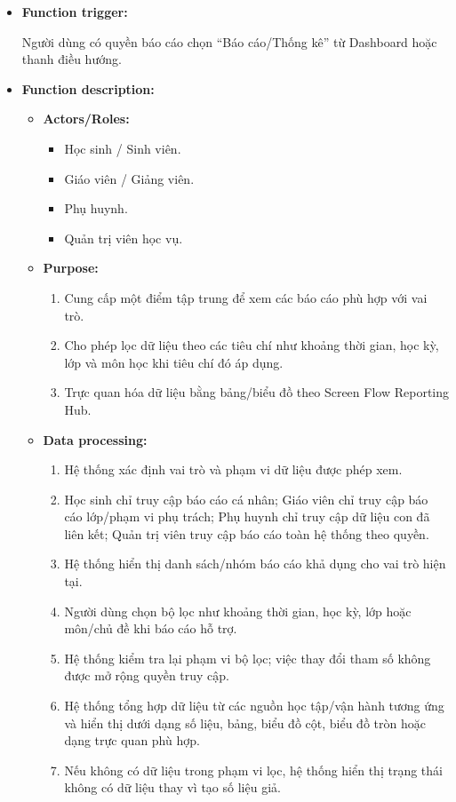 \documentclass[12pt,a4paper,oneside]{report}
\begin{document}
\begin{itemize}

    \item \textbf{Function trigger:}

    Người dùng có quyền báo cáo chọn ``Báo cáo/Thống kê'' từ Dashboard hoặc thanh điều hướng.

    \item \textbf{Function description:}

    \begin{itemize}

        \item \textbf{Actors/Roles:}
        \begin{itemize}
            \item Học sinh / Sinh viên.
            \item Giáo viên / Giảng viên.
            \item Phụ huynh.
            \item Quản trị viên học vụ.
        \end{itemize}

        \item \textbf{Purpose:}
        \begin{enumerate}
            \item Cung cấp một điểm tập trung để xem các báo cáo phù hợp với vai trò.
            \item Cho phép lọc dữ liệu theo các tiêu chí như khoảng thời gian, học kỳ, lớp và môn học khi tiêu chí đó áp dụng.
            \item Trực quan hóa dữ liệu bằng bảng/biểu đồ theo Screen Flow Reporting Hub.
        \end{enumerate}

        \item \textbf{Data processing:}
        \begin{enumerate}
            \item Hệ thống xác định vai trò và phạm vi dữ liệu được phép xem.
            \item Học sinh chỉ truy cập báo cáo cá nhân; Giáo viên chỉ truy cập báo cáo lớp/phạm vi phụ trách; Phụ huynh chỉ truy cập dữ liệu con đã liên kết; Quản trị viên truy cập báo cáo toàn hệ thống theo quyền.
            \item Hệ thống hiển thị danh sách/nhóm báo cáo khả dụng cho vai trò hiện tại.
            \item Người dùng chọn bộ lọc như khoảng thời gian, học kỳ, lớp hoặc môn/chủ đề khi báo cáo hỗ trợ.
            \item Hệ thống kiểm tra lại phạm vi bộ lọc; việc thay đổi tham số không được mở rộng quyền truy cập.
            \item Hệ thống tổng hợp dữ liệu từ các nguồn học tập/vận hành tương ứng và hiển thị dưới dạng số liệu, bảng, biểu đồ cột, biểu đồ tròn hoặc dạng trực quan phù hợp.
            \item Nếu không có dữ liệu trong phạm vi lọc, hệ thống hiển thị trạng thái không có dữ liệu thay vì tạo số liệu giả.
        \end{enumerate}


\end{itemize}
\end{itemize}
\end{document}
